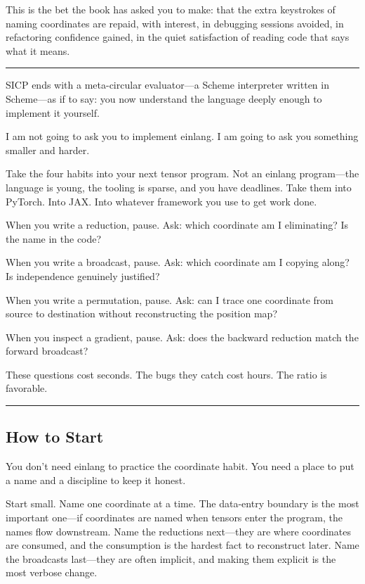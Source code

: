 \documentclass[11pt,]{article}
\begin{document}
This is the bet the book has asked you to make: that the extra
keystrokes of naming coordinates are repaid, with interest, in debugging
sessions avoided, in refactoring confidence gained, in the quiet
satisfaction of reading code that says what it means.

\begin{center}\rule{0.5\linewidth}{0.4pt}\end{center}

SICP ends with a meta-circular evaluator---a Scheme interpreter written
in Scheme---as if to say: you now understand the language deeply enough
to implement it yourself.

I am not going to ask you to implement einlang. I am going to ask you
something smaller and harder.

Take the four habits into your next tensor program. Not an einlang
program---the language is young, the tooling is sparse, and you have
deadlines. Take them into PyTorch. Into JAX. Into whatever framework you
use to get work done.

When you write a reduction, pause. Ask: which coordinate am I
eliminating? Is the name in the code?

When you write a broadcast, pause. Ask: which coordinate am I copying
along? Is independence genuinely justified?

When you write a permutation, pause. Ask: can I trace one coordinate
from source to destination without reconstructing the position map?

When you inspect a gradient, pause. Ask: does the backward reduction
match the forward broadcast?

These questions cost seconds. The bugs they catch cost hours. The ratio
is favorable.

\begin{center}\rule{0.5\linewidth}{0.4pt}\end{center}

\hypertarget{how-to-start}{%
\subsection{How to Start}\label{how-to-start}}

You don't need einlang to practice the coordinate habit. You need a
place to put a name and a discipline to keep it honest.

Start small. Name one coordinate at a time. The data-entry boundary is
the most important one---if coordinates are named when tensors enter the
program, the names flow downstream. Name the reductions next---they are
where coordinates are consumed, and the consumption is the hardest fact
to reconstruct later. Name the broadcasts last---they are often
implicit, and making them explicit is the most verbose change.
\end{document}
